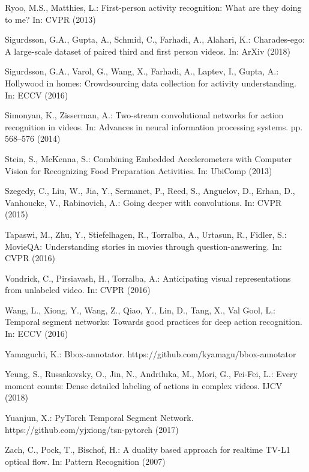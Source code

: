 \documentclass[runningheads]{llncs}
\begin{document}
\begin{thebibliography}{10}
Ryoo, M.S., Matthies, L.: First-person activity recognition: What are they
  doing to me? In: CVPR (2013)

Sigurdsson, G.A., Gupta, A., Schmid, C., Farhadi, A., Alahari, K.:
  Charades-ego: A large-scale dataset of paired third and first person videos.
  In: ArXiv (2018)

Sigurdsson, G.A., Varol, G., Wang, X., Farhadi, A., Laptev, I., Gupta, A.:
  Hollywood in homes: Crowdsourcing data collection for activity understanding.
  In: ECCV (2016)

Simonyan, K., Zisserman, A.: Two-stream convolutional networks for action
  recognition in videos. In: Advances in neural information processing systems.
  pp. 568--576 (2014)

Stein, S., McKenna, S.: {Combining Embedded Accelerometers with Computer Vision
  for Recognizing Food Preparation Activities}. In: {UbiComp} (2013)

Szegedy, C., Liu, W., Jia, Y., Sermanet, P., Reed, S., Anguelov, D., Erhan, D.,
  Vanhoucke, V., Rabinovich, A.: Going deeper with convolutions. In: CVPR
  (2015)

Tapaswi, M., Zhu, Y., Stiefelhagen, R., Torralba, A., Urtasun, R., Fidler, S.:
  {MovieQA}: Understanding stories in movies through question-answering. In:
  CVPR (2016)

Vondrick, C., Pirsiavash, H., Torralba, A.: Anticipating visual representations
  from unlabeled video. In: CVPR (2016)

Wang, L., Xiong, Y., Wang, Z., Qiao, Y., Lin, D., Tang, X., {Val Gool}, L.:
  Temporal segment networks: Towards good practices for deep action
  recognition. In: ECCV (2016)

Yamaguchi, K.: {Bbox-annotator}. https://github.com/kyamagu/bbox-annotator

Yeung, S., Russakovsky, O., Jin, N., Andriluka, M., Mori, G., Fei-Fei, L.:
  Every moment counts: Dense detailed labeling of actions in complex videos.
  IJCV  (2018)

Yuanjun, X.: {PyTorch} {Temporal Segment Network}.
  https://github.com/yjxiong/tsn-pytorch (2017)

Zach, C., Pock, T., Bischof, H.: A duality based approach for realtime {TV-L1}
  optical flow. In: Pattern Recognition (2007)


\end{thebibliography}
\end{document}
